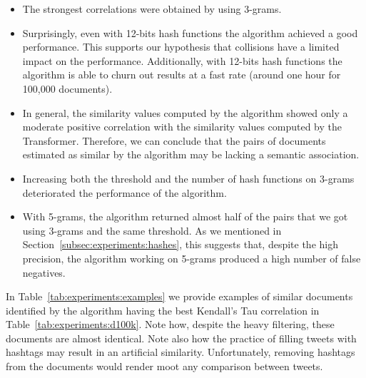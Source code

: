\documentclass[runningheads]{llncs}
\begin{document}
\begin{itemize}
  \item The strongest correlations were obtained by using 3-grams.
  \item Surprisingly, even with 12-bits hash functions the algorithm achieved a good performance. This supports our hypothesis that collisions have a limited impact on the performance. Additionally, with 12-bits hash functions the algorithm is able to churn out results at a fast rate (around one hour for 100,000 documents).   
  \item In general, the similarity values computed by the algorithm showed only a moderate positive correlation with the similarity values computed by the Transformer. Therefore, we can conclude that the pairs of documents estimated as similar by the algorithm may be lacking a semantic association.
  \item Increasing both the threshold and the number of hash functions on 3-grams deteriorated the performance of the algorithm.
  \item With 5-grams, the algorithm returned almost half of the pairs that we got using 3-grams and the same threshold. As we mentioned in Section~\ref{subsec:experiments:hashes}, this suggests that, despite the high precision, the algorithm working on 5-grams produced a high number of false negatives. 
\end{itemize}

In Table~\ref{tab:experiments:examples} we provide examples of similar documents identified by the algorithm having the best Kendall's Tau correlation in Table~\ref{tab:experiments:d100k}. Note how, despite the heavy filtering, these documents are almost identical. Note also how the practice of filling tweets with hashtags may result in an artificial similarity. Unfortunately, removing hashtags from the documents would render moot any comparison between tweets. 
\end{document}
